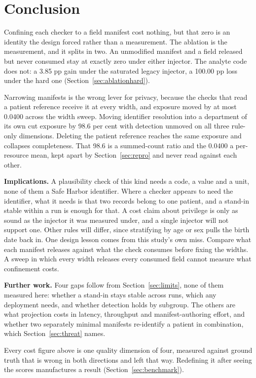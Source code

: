 \section{Conclusion}
\label{sec:conclusion}

Confining each checker to a field manifest cost nothing, but that zero is an identity the design
forced rather than a measurement. The ablation is the measurement, and it splits in two. An
unmodified manifest and a field released but never consumed stay at exactly zero under either
injector. The analyte code does not: a 3.85 pp gain under the saturated legacy injector, a 100.00 pp
loss under the hard one (Section~\ref{sec:ablationhard}).

Narrowing manifests is the wrong lever for privacy, because the checks that read a patient reference
receive it at every width, and exposure moved by at most 0.0400 across the width sweep. Moving
identifier resolution into a department of its own cut exposure by 98.6 per cent with detection
unmoved on all three rule-only dimensions. Deleting the patient reference reaches the same exposure
and collapses completeness. That 98.6 is a summed-count ratio and the 0.0400 a per-resource mean,
kept apart by Section~\ref{sec:repro} and never read against each other.

\textbf{Implications.} A plausibility check of this kind needs a code, a value and a unit, none of
them a Safe Harbor identifier. Where a checker appears to need the identifier, what it needs is that
two records belong to one patient, and a stand-in stable within a run is enough for that. A cost
claim about privilege is only as sound as the injector it was measured under, and a single injector
will not support one. Other rules will differ, since stratifying by age or sex pulls the birth date
back in. One design lesson comes from this study's own miss. Compare what each manifest releases
against what the check consumes before fixing the widths. A sweep in which every width releases
every consumed field cannot measure what confinement costs.

\textbf{Further work.} Four gaps follow from Section~\ref{sec:limits}, none of them measured here:
whether a stand-in stays stable across runs, which any deployment needs, and whether detection holds
by subgroup. The others are what projection costs in latency, throughput and manifest-authoring
effort, and whether two separately minimal manifests re-identify a patient in combination, which
Section~\ref{sec:threat} names.

Every cost figure above is one quality dimension of four, measured against ground truth that is
wrong in both directions and left that way. Redefining it after seeing the scores manufactures a
result (Section~\ref{sec:benchmark}).

\label{page:refs}
